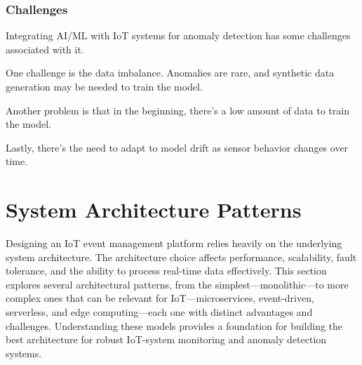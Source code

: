 \subsubsection{Challenges}

Integrating \gls{AI}/\gls{ML} with \gls{IoT} systems for anomaly detection
has some challenges associated with it.

One challenge is the data imbalance.
Anomalies are rare, and synthetic data generation may be needed to train
the model.

Another problem is that in the beginning, there's a low amount of data to
train the model.

Lastly, there's the need to adapt to model drift as sensor behavior
changes over time.

\section{System Architecture Patterns}
Designing an IoT event management platform relies heavily on the underlying
system architecture. The architecture choice affects performance, scalability,
fault tolerance, and the ability to process real-time data effectively. This
section explores several architectural patterns, from the simplest---monolithic---to
more complex ones that can be relevant for IoT---microservices,
event-driven, serverless, and edge computing---each one with distinct
advantages and challenges. Understanding these models provides a foundation for
building the best architecture for robust IoT-system monitoring and anomaly
detection systems.

